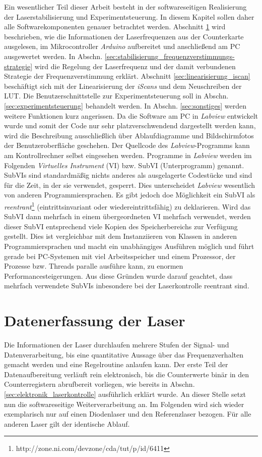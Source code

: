 Ein wesentlicher Teil dieser Arbeit besteht in der softwareseitigen Realisierung
der Laserstabilisierung und Experimentsteuerung. In diesem Kapitel sollen daher
alle Softwarekomponenten genauer betrachtet werden. Abschnitt
\ref{sec:datenerfassung_der_laser} wird beschrieben, wie die Informationen
der Laserfrequenzen aus der Counterkarte ausgelesen, im
Mikrocontroller \textit{Arduino} aufbereitet und anschließend am PC ausgewertet
werden. In Abschn. \ref{sec:stabilisierung_frequenzverstimmungs-strategie} wird die Regelung
der Laserfrequenz und der damit verbundenen Strategie der Frequenzverstimmung
erklärt. Abschnitt \ref{sec:linearisierung_iscan} beschäftigt sich mit der
Linearisierung der \textit{iScans} und dem Neuschreiben der LUT. Die
Benutzerschnittstelle zur Experimentsteuerung soll in Abschn.
\ref{sec:experimentsteuerung} behandelt werden. In Abschn. \ref{sec:sonstiges}
werden weitere Funktionen kurz angerissen. Da die Software am PC in
\textit{Labview} entwickelt wurde und somit der Code nur sehr platzverschwendend
dargestellt werden kann, wird die Beschreibung ausschließlich über
Ablaufdiagramme und Bildschirmfotos der Benutzeroberfläche geschehen. Der
Quellcode des \textit{Labview}-Programms kann am Kontrollrechner selbst eingesehen
werden. Programme in \textit{Labview} werden im Folgenden \textit{Virtuelles
Instrument} (VI) bzw. SubVI (Unterprogramm) genannt. SubVIs sind standardmäßig
nichts anderes als ausgelagerte Codestücke und sind für die Zeit, in der sie
verwendet, gesperrt. Dies unterscheidet \textit{Labview} wesentlich von anderen
Programmiersprachen. Es gibt jedoch doe Möglichkeit ein SubVI als
\textit{reentrant}\footnote{http://zone.ni.com/devzone/cda/tut/p/id/6411}
(eintrittsinvariant oder wiedereintrittsfähig) zu deklarieren. Wird das SubVI dann mehrfach in einem übergeordneten VI mehrfach
verwendet, werden dieser SubVI entsprechend viele Kopien des Speicherbereichs
zur Verfügung gestellt. Dies ist vergleichbar mit dem Instanziieren von Klassen
in anderen Programmiersprachen und macht ein unabhängiges Ausführen möglich und
führt gerade bei PC-Systemen mit viel Arbeitsspeicher und einem Prozessor, der
Prozesse bzw. Threads paralle ausführe kann, zu enormen Performancesteigerungen.
Aus diese Gründen wurde darauf geachtet, dass mehrfach verwendete SubVIs
inbesondere bei der Laserkontrolle reentrant sind.

\section{Datenerfassung der Laser}\label{sec:datenerfassung_der_laser}
Die Informationen der Laser durchlaufen mehrere Stufen der Signal- und
Datenverarbeitung, bis eine quantitative Aussage über das Frequenzverhalten
gemacht werden und eine Regelroutine anlaufen kann. Der erste Teil der
Datenaufbereitung verläuft rein elektronisch, bis die Counterwerte binär in
den Counterregistern abrufbereit vorliegen, wie bereits in Abschn.
\ref{sec:elektronik_laserkontrolle} ausführlich erklärt wurde. An dieser Stelle
setzt nun die softwareseitige Weiterverarbeitung an. Im Folgenden wird sich
wieder exemplarisch nur auf einen Diodenlaser und den Referenzlaser bezogen.
Für alle anderen Laser gilt der identische Ablauf.

